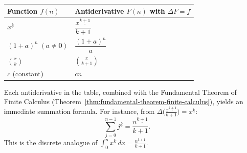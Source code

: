 \begin{remark*}[Interpretation]
\renewcommand{\arraystretch}{1.7}
\begin{tabular}{@{}l l@{}}
\textbf{Function \(f(n)\)} & \textbf{Antiderivative \(F(n)\) with \(\Delta F = f\)} \\
\hline
$x^{\underline{k}}$ & $\dfrac{x^{\underline{k+1}}}{k+1}$ \\[6pt]
$(1+a)^n\;(a\ne 0)$ & $\dfrac{(1+a)^n}{a}$ \\[6pt]
$\binom{x}{k}$ & $\binom{x}{k+1}$ \\[6pt]
$c$ (constant) & $cn$ \\
\end{tabular}
\end{remark*}

\begin{remark*}[Interpretation]
Each antiderivative in the table, combined with the Fundamental Theorem
of Finite Calculus (Theorem~\ref{thm:fundamental-theorem-finite-calculus}), yields an immediate
summation formula. For instance, from \(\Delta\bigl(\tfrac{x^{\underline{k+1}}}{k+1}\bigr) = x^{\underline{k}}\):
\[
\sum_{j=0}^{n-1} j^{\underline{k}}
= \frac{n^{\underline{k+1}}}{k+1}.
\]
This is the discrete analogue of \(\int_0^n x^k\,dx = \tfrac{n^{k+1}}{k+1}\).
\end{remark*}

